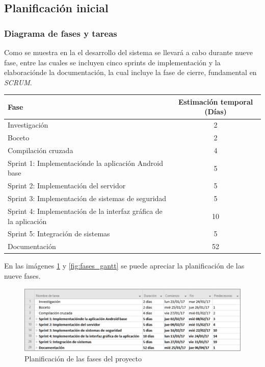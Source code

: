 \documentclass[12pt]{article}
\begin{document}
    \subsection{Planificación inicial}
        \subsubsection{Diagrama de fases y tareas}
        Como se muestra en la  el desarrollo del sistema se llevará a cabo durante nueve fase, entre las cuales se incluyen cinco sprints de implementación y la elaboraciónde la documentación, la cual incluye la fase de cierre, fundamental en \textit{SCRUM}.

        \begin{tabular}{|l|c|}
            \hline
            \textbf{Fase}  & \textbf{Estimación temporal} (Días) \\           
            \hline
            Investigación                                                       &   2    \\
            Boceto                                                              &   2    \\
            Compilación cruzada                                                 &   4    \\
            Sprint 1: Implementaciónde la aplicación Android base               &   5    \\
            Sprint 2: Implementación del servidor                               &   5    \\
            Sprint 3: Implementación de sistemas de seguridad                   &   5    \\
            Sprint 4: Implementación de la interfaz gráfica de la aplicación    &   10   \\
            Sprint 5: Integración de sistemas                                   &   5    \\
            Documentación                                                       &   52   \\
            \hline
        \end{tabular}

        En las imágenes \ref{fig:fases} y \ref{fig:fases_gantt} se puede apreciar la planificación de las nueve fases.

        \begin{figure}[h!]
            \centering
                \includegraphics[scale=0.7]{fases.eps}
                \caption*{Planificación de las fases del proyecto}
                \label{fig:fases}
        \end{figure}
\end{document}
